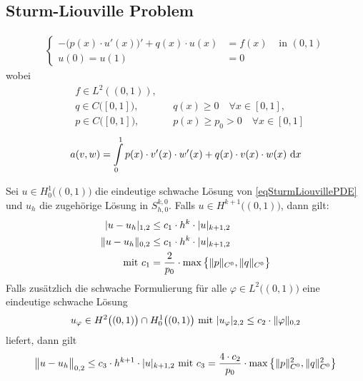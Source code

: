\subsection*{Sturm-Liouville Problem}
\begin{align}\label{eqSturmLiouvillePDE}\tag{SturmLiouville}
	\left\lbrace\begin{array}{rll}
		-\big(p(x)\cdot u'(x)\big)'+q(x)\cdot u(x) &= f(x) &\text{ in } (0,1)\\
		u(0)=u(1)&=0 &
	\end{array}
	\right.
\end{align}
wobei
\begin{align*}
	&f\in L^2((0,1)),\\
	&q\in C\big([0,1]\big), &&q(x)\geq0\quad\forall x\in[0,1], \\
	&p\in C\big([0,1]\big), &&p(x)\geq p_0>0\quad\forall x\in [0,1]
\end{align*}
\begin{align*}
	a(v,w)=\int\limits_0^1 p(x)\cdot v'(x)\cdot w'(x)+q(x)\cdot v(x)\cdot w(x)\d x
\end{align*}

\begin{theorem}\label{theorem4.4}
	Sei $u\in H^1_0\big((0,1)\big)$ die eindeutige schwache Lösung von \eqref{eqSturmLiouvillePDE} und $u_h$ die zugehörige Lösung in $S_{h,0}^{k,0}$.
	Falls $u\in H^{k+1}\big((0,1)\big)$, dann gilt:
	\begin{align*}
		|u-u_h|_{1,2}&\leq c_1\cdot h^k\cdot |u|_{k+1,2}\\
		\Vert u-u_h\Vert_{0,2}&\leq c_1\cdot h^k\cdot |u|_{k+1,2}\\
		\mit c_1&=\frac{2}{p_0}\cdot\max\limits\big\lbrace \Vert p\Vert_{C^0},\Vert q\Vert_{C^0}\big\rbrace
	\end{align*}
	Falls zusätzlich die schwache Formulierung für alle $\varphi\in L^2\big((0,1)\big)$ eine eindeutige schwache Lösung
	\begin{align*}
		u_\varphi\in H^2\big((0,1)\big)\cap H^1_0\big((0,1)\big)\mit |u_\varphi|_{2,2}\leq c_2\cdot\Vert \varphi\Vert_{0,2}
	\end{align*}
	liefert, dann gilt
	\begin{align*}
		\big\Vert u-u_h\big\Vert_{0,2}\leq c_3\cdot h^{k+1}\cdot |u|_{k+1,2}
		\mit c_3=\frac{4\cdot c_2}{p_0}\cdot\max\limits\left\lbrace\Vert p\Vert^2_{C^0},\Vert q\Vert^2_{C^0}\right\rbrace
	\end{align*}
\end{theorem}

